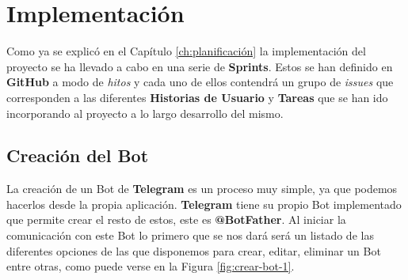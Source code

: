 \chapter{Implementación}

Como ya se explicó en el Capítulo \ref{ch:planificación} la implementación del proyecto se ha llevado a cabo en una serie de \textbf{Sprints}. Estos se han definido en \textbf{GitHub} a modo de \textit{hitos} y cada uno de ellos contendrá un grupo de \textit{issues} que corresponden a las diferentes \textbf{Historias de Usuario} y \textbf{Tareas} que se han ido incorporando al proyecto a lo largo desarrollo del mismo. \\

\section{Creación del Bot}

La creación de un Bot de \textbf{Telegram} es un proceso muy simple, ya que podemos hacerlos desde la propia aplicación. \textbf{Telegram} tiene su propio Bot implementado que permite crear el resto de estos, este es \textbf{@BotFather}. Al iniciar la comunicación con este Bot lo primero que se nos dará será un listado de las diferentes opciones de las que disponemos para crear, editar, eliminar un Bot entre otras, como puede verse en la Figura \ref{fig:crear-bot-1}.

